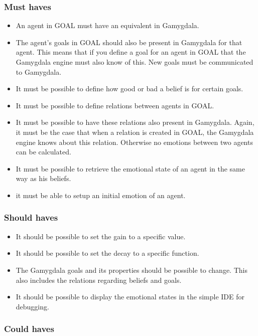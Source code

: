 \documentclass[]{article}
\begin{document}
\subsubsection*{Must haves}
\begin{itemize}
	\item An \gls{agent} in GOAL must have an equivalent in Gamygdala.
	\item The agent's goals in GOAL should also be present in Gamygdala for that agent. This means that if you define a goal for an agent in GOAL that the Gamygdala engine must also know of this. New goals must be communicated to Gamygdala.
	\item It must be possible to define how good or bad a belief is for certain goals.
	\item It must be possible to define relations between agents in GOAL.
	\item It must be possible to have these relations also present in Gamygdala. Again, it must be the case that when a relation is created in GOAL, the Gamygdala engine knows about this relation. Otherwise no emotions between two agents can be calculated.
	\item It must be possible to retrieve the emotional state of an agent in the same way as his beliefs.
	\item it must be able to setup an initial emotion of an agent.
\end{itemize}
 
\subsubsection*{Should haves}

\begin{itemize}
	\item It should be possible to set the gain to a specific value.
	\item It should be possible to set the decay to a specific function.
	\item The  Gamygdala goals and its properties should be possible to change. This also includes the relations regarding beliefs and goals.
	\item It should be possible to display the emotional states in the simple IDE for debugging.
\end{itemize}


\subsubsection*{Could haves}
\end{document}
